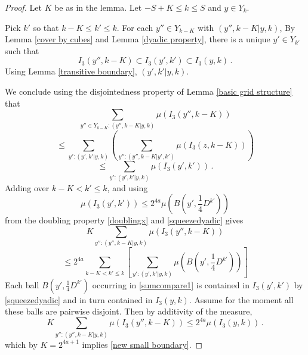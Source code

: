 \begin{proof}
Let $K$ be as in the lemma. Let $-S+K\le k\le S$ and $y\in Y_k$.

Pick $k'$ so that $k-K\le k'\le k$.
For each $y''\in Y_{k-K}$ with $(y'',k-K| y,k)$,
By Lemma \ref{cover by cubes} and Lemma \ref{dyadic property}, there is a unique $y'\in Y_{k'}$ such that
\begin{equation}
    I_3(y'',k-K)\subset I_3(y',k')\subset I_3(y,k)\, .
\end{equation}
Using Lemma \ref{transitive boundary}, $(y',k'|y,k)$.

We conclude using the disjointedness property of
Lemma \ref{basic grid structure} that
\begin{equation}\label{scalecompare}
    \sum_{y''\in Y_{k-K}: (y'',k-K|y,k)}\mu(I_3(y'',k-K))
\end{equation}
\begin{equation}
    \le
\sum_{y': (y',k'|y,k)}\left(
 \sum_{y'': (y'',k-K|y',k')}\mu(I_3(z,k-K))\right)
\end{equation}
   \begin{equation}
   \le
\sum_{y': (y',k'|y,k)}
\mu(I_3(y',k'))    \, .
   \end{equation}
Adding over $k-K<k'\le k$, and using
\[\mu(I_3(y',k'))\le 2^{4a} \mu(B(y', \frac 14 D^{k'}))\]
from the doubling property \eqref{doublingx} and
\eqref{squeezedyadic} gives
\begin{equation}\label{sumcompare}
    K\sum_{y'': (y'',k-K|y,k)}
    \mu(I_3(y'',k-K))
\end{equation}
\begin{equation}\label{sumcompare1}
    \le 2^{4a} \sum_{k-K<k'\le k}
   \left[ \sum_{y': (y',k'|y,k)}
\mu(B(y', \frac 14 D^{k'}))\right]
\end{equation}
Each ball $B(y', \frac 14 D^{k'})$ occurring in
\eqref{sumcompare1} is contained in $I_3(y',k')$
by \eqref{squeezedyadic} and in turn contained in
$I_3(y,k)$. Assume for the moment all these balls are pairwise disjoint. Then
by additivity of the measure,
\begin{equation}
    K\sum_{y'': (y'',k-K|y,k)}
    \mu(I_3(y'',k-K))
    \le 2^{4a}
\mu(I_3(y,k))\, .
\end{equation}
which by $K=2^{4a+1}$ implies \eqref{new small boundary}.


\end{proof}
